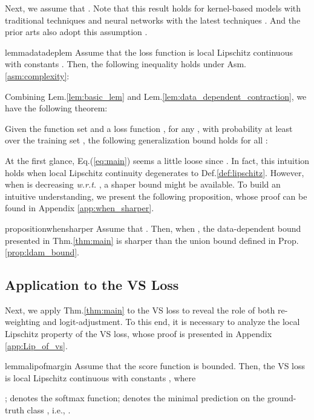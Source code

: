 \begin{assumption}
    \label{asm:complexity}
    Next, we assume that . Note that this result holds for kernel-based models with traditional techniques \cite{10.5555/2371238} and neural networks with the latest techniques \cite{DBLP:conf/colt/GolowichRS18,DBLP:conf/iclr/LongS20}. And the prior arts also adopt this assumption \cite{DBLP:conf/nips/CaoWGAM19}.
\end{assumption}

\begin{restatable}{lemma}{datadeplem}
    \label{lem:data_dependent_contraction}
    Assume that the loss function  is local Lipschitz continuous with constants . Then, the following inequality holds under Asm.\ref{asm:complexity}:
    
\end{restatable}

Combining Lem.\ref{lem:basic_lem} and Lem.\ref{lem:data_dependent_contraction}, we have the following theorem:
\begin{theorem}
    \label{thm:main}
    Given the function set  and a loss function , for any , with probability at least  over the training set , the following generalization bound holds for all :
    
\end{theorem}

At the first glance, Eq.(\ref{eq:main}) seems a little loose since . In fact, this intuition holds when local Lipschitz continuity degenerates to Def.\ref{def:lipschitz}. However, when  is decreasing \textit{w.r.t.} , a shaper bound might be available. To build an intuitive understanding, we present the following proposition, whose proof can be found in Appendix \ref{app:when_sharper}.
\begin{restatable}{proposition}{whensharper}
    \label{prop:when_sharper}
    Assume that . Then, when , the data-dependent bound presented in Thm.\ref{thm:main} is sharper than the union bound defined in Prop.\ref{prop:ldam_bound}.
\end{restatable}

\subsection{Application to the VS Loss}
\label{subsec:application}
Next, we apply Thm.\ref{thm:main} to the VS loss to reveal the role of both re-weighting and logit-adjustment. To this end, it is necessary to analyze the local Lipschitz property of the VS loss, whose proof is presented in Appendix \ref{app:Lip_of_vs}.
\begin{restatable}{lemma}{lipofmargin}
    \label{lem:Lip_of_vs}
    Assume that the score function is bounded. Then, the VS loss is local Lipschitz continuous with constants , where 
    
    ;  denotes the softmax function;  denotes the minimal prediction on the ground-truth class , i.e., .
\end{restatable}

